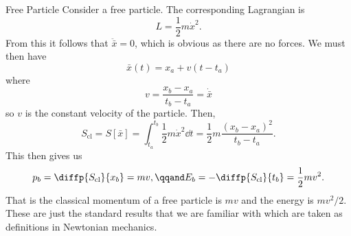 \documentclass[fleqn]{NotesClass}
\newcommand*{\lagrangian}{L}
\newcommand*{\cl}{\mathrm{cl}}
\begin{document}
    \begin{exm}{Free Particle}{}
        Consider a free particle.
        The corresponding Lagrangian is
        \begin{equation}
            \lagrangian = \frac{1}{2}m\dot{x}^2.
        \end{equation}
        From this it follows that \(\ddot{\bar{x}} = 0\), which is obvious as there are no forces.
        We must then have
        \begin{equation}
            \bar{x}(t) = x_a + v(t - t_a)
        \end{equation}
        where
        \begin{equation}
            v = \frac{x_b - x_a}{t_b - t_a} = \dot{\bar{x}}
        \end{equation}
        so \(v\) is the constant velocity of the particle.
        Then,
        \begin{equation}\label{eqn:classical action free particle}
            S_{\cl} = S[\bar{x}] = \int_{t_a}^{t_b} \frac{1}{2}m\dot{x}^2 \dd{t} = \frac{1}{2}m \frac{(x_b - x_a)^2}{t_b - t_a}.
        \end{equation}
        This then gives us
        \begin{equation}
            p_b = \diffp{S_{\cl}}{x_b} = mv, \qqand E_b = - \diffp{S_{\cl}}{t_b} = \frac{1}{2}mv^2.
        \end{equation}
        That is the classical momentum of a free particle is \(mv\) and the energy is \(mv^2/2\).
        These are just the standard results that we are familiar with which are taken as definitions in Newtonian mechanics.
    \end{exm}
    
\end{document}
